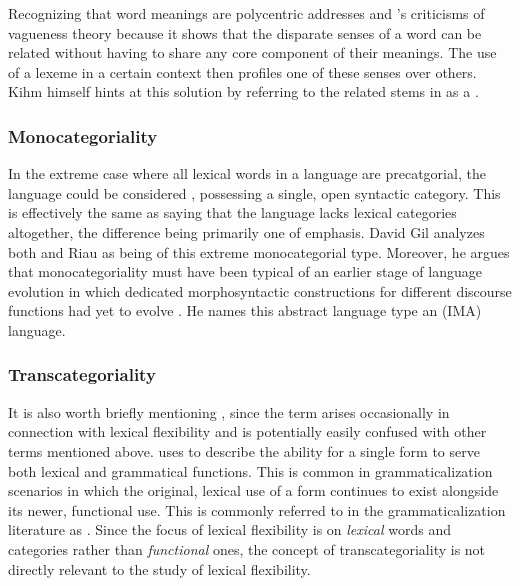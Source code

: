 Recognizing that word meanings are polycentric addresses \citeauthor{EvansOsada2005} and \citeauthor{Kihm2017}'s criticisms of vagueness theory because it shows that the disparate senses of a word can be related without having to share any core component of their meanings. The use of a lexeme in a certain context then profiles one of these senses over others. Kihm himself hints at this solution by referring to the related  stems in  as a .

\subsubsection{Monocategoriality}
\label{sec:2.3.1.5}

In the extreme case where all lexical words in a language are precatgorial, the language could be considered , possessing a single, open syntactic category. This is effectively the same as saying that the language lacks lexical categories altogether, the difference being primarily one of emphasis. David Gil analyzes both  \parencite*{Gil1995} and Riau  \parencite*{Gil1994} as being of this extreme monocategorial type. Moreover, he argues that monocategoriality must have been typical of an earlier stage of language evolution in which dedicated morphosyntactic constructions for different discourse functions had yet to evolve \parencites{Gil2005}{Gil2006}{Gil2012}. He names this abstract language type an  (IMA) language.

\subsubsection{Transcategoriality}
\label{sec:2.3.1.6}

It is also worth briefly mentioning , since the term arises occasionally in connection with lexical flexibility and is potentially easily confused with other terms mentioned above. \textcite{Robert2003} uses  to describe the ability for a single form to serve both lexical and grammatical functions. This is common in grammaticalization scenarios in which the original, lexical use of a form continues to exist alongside its newer, functional use. This is commonly referred to in the grammaticalization literature as  \parencite[118]{HopperTraugott2003}. Since the focus of lexical flexibility is on \emph{lexical} words and categories rather than \emph{functional} ones, the concept of transcategoriality is not directly relevant to the study of lexical flexibility.

